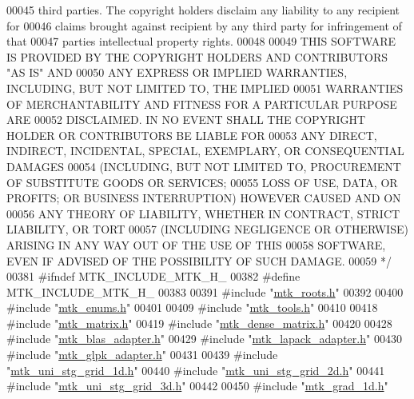 \begin{DoxyCode}
00045 \textcolor{comment}{third parties. The copyright holders disclaim any liability to any recipient for}
00046 \textcolor{comment}{claims brought against recipient by any third party for infringement of that}
00047 \textcolor{comment}{parties intellectual property rights.}
00048 \textcolor{comment}{}
00049 \textcolor{comment}{THIS SOFTWARE IS PROVIDED BY THE COPYRIGHT HOLDERS AND CONTRIBUTORS "AS IS" AND}
00050 \textcolor{comment}{ANY EXPRESS OR IMPLIED WARRANTIES, INCLUDING, BUT NOT LIMITED TO, THE IMPLIED}
00051 \textcolor{comment}{WARRANTIES OF MERCHANTABILITY AND FITNESS FOR A PARTICULAR PURPOSE ARE}
00052 \textcolor{comment}{DISCLAIMED. IN NO EVENT SHALL THE COPYRIGHT HOLDER OR CONTRIBUTORS BE LIABLE FOR}
00053 \textcolor{comment}{ANY DIRECT, INDIRECT, INCIDENTAL, SPECIAL, EXEMPLARY, OR CONSEQUENTIAL DAMAGES}
00054 \textcolor{comment}{(INCLUDING, BUT NOT LIMITED TO, PROCUREMENT OF SUBSTITUTE GOODS OR SERVICES;}
00055 \textcolor{comment}{LOSS OF USE, DATA, OR PROFITS; OR BUSINESS INTERRUPTION) HOWEVER CAUSED AND ON}
00056 \textcolor{comment}{ANY THEORY OF LIABILITY, WHETHER IN CONTRACT, STRICT LIABILITY, OR TORT}
00057 \textcolor{comment}{(INCLUDING NEGLIGENCE OR OTHERWISE) ARISING IN ANY WAY OUT OF THE USE OF THIS}
00058 \textcolor{comment}{SOFTWARE, EVEN IF ADVISED OF THE POSSIBILITY OF SUCH DAMAGE.}
00059 \textcolor{comment}{*/}
00381 \textcolor{preprocessor}{#ifndef MTK\_INCLUDE\_MTK\_H\_}
00382 \textcolor{preprocessor}{#define MTK\_INCLUDE\_MTK\_H\_}
00383 
00391 \textcolor{preprocessor}{#include "\hyperlink{mtk__roots_8h}{mtk\_roots.h}"}
00392 
00400 \textcolor{preprocessor}{#include "\hyperlink{mtk__enums_8h}{mtk\_enums.h}"}
00401 
00409 \textcolor{preprocessor}{#include "\hyperlink{mtk__tools_8h}{mtk\_tools.h}"}
00410 
00418 \textcolor{preprocessor}{#include "\hyperlink{mtk__matrix_8h}{mtk\_matrix.h}"}
00419 \textcolor{preprocessor}{#include "\hyperlink{mtk__dense__matrix_8h}{mtk\_dense\_matrix.h}"}
00420 
00428 \textcolor{preprocessor}{#include "\hyperlink{mtk__blas__adapter_8h}{mtk\_blas\_adapter.h}"}
00429 \textcolor{preprocessor}{#include "\hyperlink{mtk__lapack__adapter_8h}{mtk\_lapack\_adapter.h}"}
00430 \textcolor{preprocessor}{#include "\hyperlink{mtk__glpk__adapter_8h}{mtk\_glpk\_adapter.h}"}
00431 
00439 \textcolor{preprocessor}{#include "\hyperlink{mtk__uni__stg__grid__1d_8h}{mtk\_uni\_stg\_grid\_1d.h}"}
00440 \textcolor{preprocessor}{#include "\hyperlink{mtk__uni__stg__grid__2d_8h}{mtk\_uni\_stg\_grid\_2d.h}"}
00441 \textcolor{preprocessor}{#include "\hyperlink{mtk__uni__stg__grid__3d_8h}{mtk\_uni\_stg\_grid\_3d.h}"}
00442 
00450 \textcolor{preprocessor}{#include "\hyperlink{mtk__grad__1d_8h}{mtk\_grad\_1d.h}"}

\end{DoxyCode}
